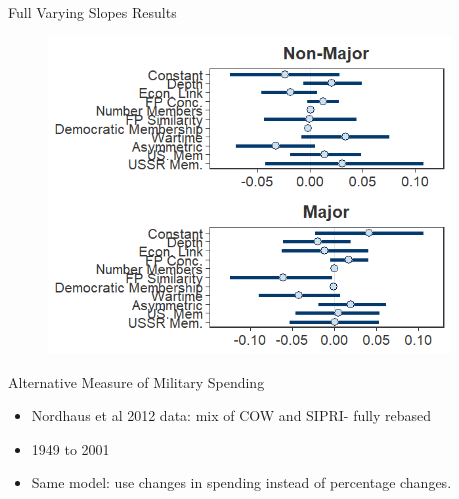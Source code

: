 \documentclass[12pt]{beamer}
\begin{document}

\begin{frame}{Full Varying Slopes Results}

\begin{figure}[htbp]
	\centering
		\includegraphics[width=0.95\textwidth]{vs-res-full.png}
\end{figure}

\end{frame}



\begin{frame}{Alternative Measure of Military Spending}


\begin{itemize} 
\item Nordhaus et al 2012 data: mix of COW and SIPRI- fully rebased
\item 1949 to 2001
\item Same model: use changes in spending instead of percentage changes. 
\end{itemize}

\end{frame}


\end{document}
